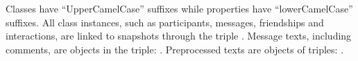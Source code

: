 																																																																																																																																																																																																																																																																																																																																																																																																															Classes have ``UpperCamelCase'' suffixes while properties have ``lowerCamelCase'' suffixes.
																																																																																																																																																																																																																																																																																																																																																																																																															All class instances, such as participants, messages, friendships and
																																																																																																																																																																																																																																																																																																																																																																																																															interactions, are linked to
																																																																																																																																																																																																																																																																																																																																																																																																															snapshots through the triple .
																																																																																																																																																																																																																																																																																																																																																																																																															Message texts, including comments, are objects in the triple: .
																																																																																																																																																																																																																																																																																																																																																																																																															Preprocessed texts are objects of triples: .
